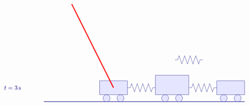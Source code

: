 \begin{solution}
\begin{itemize}
\begin{equation*}
\begin{tikzpicture}[scale=0.8, color=blue!50!black]
\begin{scope}[yshift=-4cm]
\begin{scope}[xshift=9.4cm]
            \draw (0,1) -- ++(0.2,0) -- ++(0.1,0.3)
            -- ++(0.2,-0.6) -- ++(0.2,0.6)
            -- ++(0.2,-0.6) -- ++(0.2,0.6)
            -- ++(0.2,-0.6) -- ++(0.2,0.6)
            -- ++(0.2,-0.6) -- ++(0.1,0.3)
            -- ++(0.2,0);
          \end{scope}
        \end{scope}
        \begin{scope}[yshift=-6cm]
          \draw (-3,1) node[right] {$t=3\s$};
          \draw[thick] (0,0) -- (14.4,0);
          \begin{scope}[xshift=2cm]
            \draw[fill=blue!10] (2,0.5) rectangle (4,1.5);
            \draw[fill=blue!10] (2.5,0.25) circle (0.25);
            \draw[fill=blue!10] (3.5,0.25) circle (0.25);
          \end{scope}
          \begin{scope}[xshift=6.2cm]
            \draw[fill=blue!10] (1.8,0.5) rectangle (4.2,1.9);
            \draw[fill=blue!10] (2.5,0.25) circle (0.25);
            \draw[fill=blue!10] (3.5,0.25) circle (0.25);
          \end{scope}
          \begin{scope}[xshift=10.4cm]
            \draw[fill=blue!10] (2,0.5) rectangle (4,1.5);
            \draw[fill=blue!10] (2.5,0.25) circle (0.25);
            \draw[fill=blue!10] (3.5,0.25) circle (0.25);
          \end{scope}
          \begin{scope}[xshift=6cm]
            \draw (0,1) -- ++(0.2,0) -- ++(0.1,0.3)
            -- ++(0.2,-0.6) -- ++(0.2,0.6)
            -- ++(0.2,-0.6) -- ++(0.2,0.6)
            -- ++(0.2,-0.6) -- ++(0.2,0.6)
            -- ++(0.2,-0.6) -- ++(0.1,0.3)
            -- ++(0.2,0);
          \end{scope}
          \begin{scope}[xshift=10.4cm]
            \draw (0,1) -- ++(0.2,0) -- ++(0.1,0.3)
            -- ++(0.2,-0.6) -- ++(0.2,0.6)
            -- ++(0.2,-0.6) -- ++(0.2,0.6)
            -- ++(0.2,-0.6) -- ++(0.2,0.6)
            -- ++(0.2,-0.6) -- ++(0.1,0.3)
            -- ++(0.2,0);
          \end{scope}
        \end{scope}
        \begin{scope}[xshift=3cm,yshift=1cm,rotate=-90]
          \draw[ultra thick, red] (0,-1) -- (6,2);
        \end{scope}
        \begin{scope}[xshift=7.2cm,yshift=1cm,rotate=-90]

\end{scope}
\end{tikzpicture}
\end{equation*}
\end{itemize}
\end{solution}
